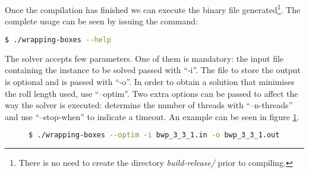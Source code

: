 Once the compilation has finished we can execute the binary file generated\footnote{ There
is no need to create the directory \textit{build-release/} prior to compiling.}. The
complete usage can be seen by issuing the command:
\begin{lstlisting}[language=bash]
$ ./wrapping-boxes --help
\end{lstlisting}

The solver accepts few parameters. One of them is mandatory: the input file
containing the instance to be solved passed with ``-i''. The file to store
the output is optional and is passed with ``-o''. In order to obtain a solution
that minimises the roll length used, use ``--optim''. Two extra options can
be passed to affect the way the solver is executed: determine the number of
threads with ``--n-threads'' and use ``--stop-when'' to indicate a timeout.
An example can be seen in figure \ref{fig:linear-programming:example-usage}.

\begin{figure}[H]
\centering
\begin{lstlisting}[language=bash,basicstyle=\centering]
$ ./wrapping-boxes --optim -i bwp_3_3_1.in -o bwp_3_3_1.out --n-threads 8
\end{lstlisting}
\label{fig:linear-programming:example-usage}
\end{figure}





